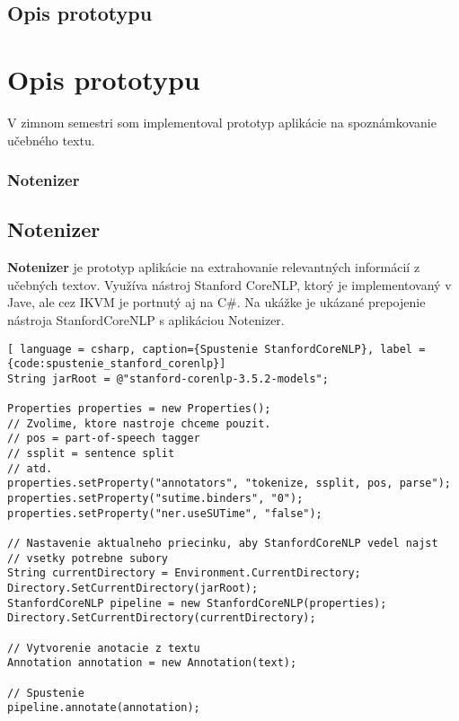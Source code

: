 %
%
{
	\section{Opis prototypu} 
}
{
	\chapter{Opis prototypu}
}
V zimnom semestri som implementoval prototyp aplikácie na spoznámkovanie učebného textu.

%
%
{
	\subsection{Notenizer} 
}
{
	\section{Notenizer}
}
\label{subsection:notenizer}
\textbf{Notenizer} je prototyp aplikácie na extrahovanie relevantných informácií z učebných textov. Využíva nástroj Stanford CoreNLP, ktorý je implementovaný v Jave, ale cez IKVM je portnutý aj na C\#. Na ukážke  je ukázané prepojenie nástroja StanfordCoreNLP s aplikáciou Notenizer. 

\begin{lstlisting}[ language = csharp, caption={Spustenie StanfordCoreNLP}, label = {code:spustenie_stanford_corenlp}]
String jarRoot = @"stanford-corenlp-3.5.2-models";

Properties properties = new Properties();
// Zvolime, ktore nastroje chceme pouzit.
// pos = part-of-speech tagger
// ssplit = sentence split
// atd.
properties.setProperty("annotators", "tokenize, ssplit, pos, parse");
properties.setProperty("sutime.binders", "0");
properties.setProperty("ner.useSUTime", "false");

// Nastavenie aktualneho priecinku, aby StanfordCoreNLP vedel najst
// vsetky potrebne subory
String currentDirectory = Environment.CurrentDirectory;
Directory.SetCurrentDirectory(jarRoot);
StanfordCoreNLP pipeline = new StanfordCoreNLP(properties);
Directory.SetCurrentDirectory(currentDirectory);

// Vytvorenie anotacie z textu
Annotation annotation = new Annotation(text);

// Spustenie
pipeline.annotate(annotation);
\end{lstlisting}

